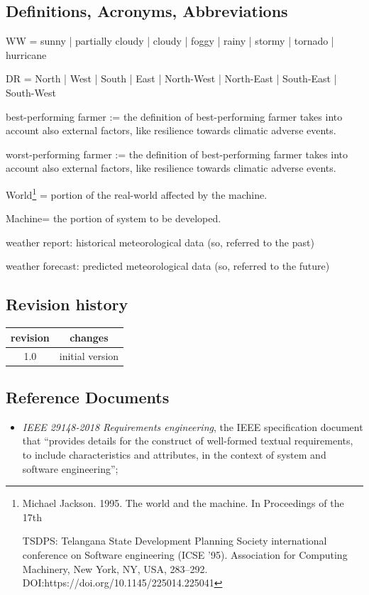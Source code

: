 \documentclass{article}
\begin{document}
\subsection{Definitions, Acronyms, Abbreviations}\label{Abbreviations}
\begin{itemize}
    \item WW = sunny | partially cloudy |  cloudy | foggy  |  rainy | stormy | tornado | hurricane
    \item DR = North | West | South | East | North-West | North-East | South-East | South-West 
    \item best-performing farmer := the definition of best-performing farmer takes into account also external factors, like resilience towards climatic adverse events.
    \item worst-performing farmer := the definition of best-performing farmer takes into account also external factors, like resilience towards climatic adverse events.
    \item World\footnote{{Michael Jackson. 1995. The world and the machine. In Proceedings of the 17th
    \item TSDPS: Telangana State Development Planning Society
international conference on Software engineering (ICSE '95). Association for
Computing Machinery, New York, NY, USA, 283–292.
DOI:https://doi.org/10.1145/225014.225041}} = portion of the real-world
affected by the machine.
\item Machine\footnotemark[10] = the portion of system to be developed.
\item weather report: historical meteorological data (so, referred to the past)
\item weather forecast: predicted meteorological data (so, referred to the future) 
\end{itemize}
\subsection{Revision history}
\begin{left}
\begin{tabular}{ |c | c |}
\hline
 revision & changes \\ 
 \hline
 1.0 &  initial version\\ 
 \hline
\end{tabular}
\end{left}
\subsection{Reference Documents}
\begin{itemize}
\item \textit{IEEE 29148-2018 Requirements engineering}, the IEEE specification document that “provides details for the construct of well-formed textual requirements, to include characteristics and attributes, in the context of system and software engineering”;
\end{itemize}
\end{document}
